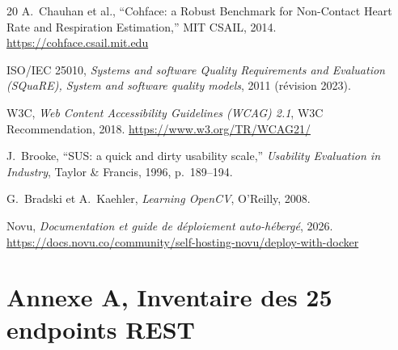 \documentclass[11pt,a4paper]{article}
\begin{document}
\begin{thebibliography}{20}
 A.~Chauhan et al., ``Cohface: a Robust Benchmark for Non-Contact Heart Rate and
Respiration Estimation,'' MIT CSAIL, 2014. \url{https://cohface.csail.mit.edu}

 ISO/IEC 25010, \textit{Systems and software Quality Requirements and Evaluation
(SQuaRE), System and software quality models}, 2011 (révision 2023).

 W3C, \textit{Web Content Accessibility Guidelines (WCAG) 2.1}, W3C Recommendation,
2018. \url{https://www.w3.org/TR/WCAG21/}

 J.~Brooke, ``SUS: a quick and dirty usability scale,'' \textit{Usability Evaluation in
Industry}, Taylor \& Francis, 1996, p.~189--194.

 G.~Bradski et A.~Kaehler, \textit{Learning OpenCV}, O'Reilly, 2008.

 Novu, \textit{Documentation et guide de déploiement auto-hébergé}, 2026.
\url{https://docs.novu.co/community/self-hosting-novu/deploy-with-docker}

\end{thebibliography}

\newpage
\appendix
\section{Annexe A, Inventaire des 25 endpoints REST}
\label{ann:a}
\end{document}
